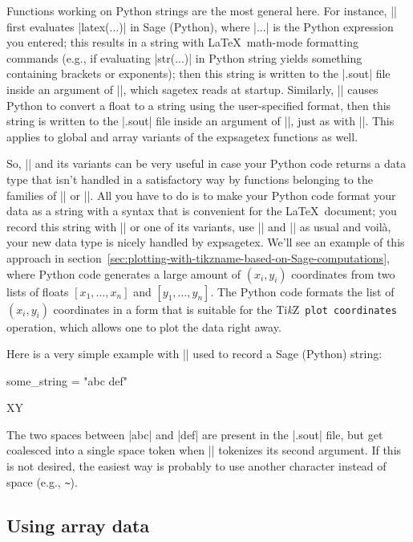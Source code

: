 \documentclass{article}
\newcommand*{\pkg}{\textsf}
\newcommand*{\tikzname}{Ti\emph{k}Z}
\begin{document}
Functions working on Python strings are the most general here. For instance,
|\estRecordFormatted| first evaluates |latex(...)| in Sage (Python), where
|...| is the Python expression you entered; this results in a string with
\LaTeX\ math-mode formatting commands (e.g., if evaluating |str(...)| in Python string yields something containing brackets or
exponents); then this string is written to the |.sout| file inside an
argument of |\newlabel|, which \pkg{sagetex} reads at startup. Similarly,
|\estRecordFloat| causes Python to convert a float to a string using the
user-specified format, then this string is written to the |.sout| file
inside an argument of |\newlabel|, just as with
|\estRecordFormatted|. This applies to global and array variants of the
\pkg{expsagetex} functions as well.

So, |\estRecordStr| and its variants can be very useful in case your
Python code returns a data type that isn't handled in a satisfactory way by
functions belonging to the families of |\estRecordFormatted| or
|\estRecordFloat|. All you have to do is to make your Python code format
your data as a string with a syntax that is convenient for the \LaTeX\
document; you record this string with |\estRecordStr| or one of its
variants, use |\estGet| and |\estRefUsed| as usual and voilà, your new data
type is nicely handled by \pkg{expsagetex}. We'll see an example of this
approach in
section~\ref{sec:plotting-with-tikzname-based-on-Sage-computations}, where
Python code generates a large amount of $(x_i, y_i)$ coordinates from two
lists of floats $[x_1, \dotsc, x_n]$ and $[y_1, \dotsc, y_n]$. The Python code
formats the list of $(x_i, y_i)$ coordinates in a form that is suitable for
the \tikzname\ \texttt{plot coordinates} operation, which allows one to plot
the data right away.

Here is a very simple example with |\estRecordStr| used to record a Sage
(Python) string:
\begin{sageblock}
 some_string = "abc  def"
\end{sageblock}
%
X\estGet{\somestring}Y%
\estRefUsed{\somestring}

The two spaces between |abc| and |def| are present in the
|.sout| file, but get coalesced into a single space token when
|\newlabel| tokenizes its second argument. If this is not desired, the
easiest way is probably to use another character instead of space (e.g.,
\verb|~|).

\subsection{Using array data}
\label{sec:using-array-data}
\end{document}
